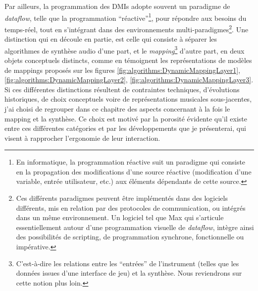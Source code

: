 \indent Par ailleurs, la programmation des \glspl{DMI} adopte souvent un paradigme de \textit{dataflow}, telle que la programmation ``réactive''\footnote{En informatique, la programmation réactive suit un paradigme qui consiste en la propagation des modifications d'une source réactive (modification d'une variable, entrée utilisateur, etc.) aux éléments dépendants de cette source.}, pour répondre aux besoins du temps-réel, tout en s'intégrant dans des environnements multi-paradigmes\footnote{Ces différents paradigmes peuvent être implémentés dans des logiciels différents, mis en relation par des protocoles de communication, ou intégrés dans un même environnement. Un logiciel tel que Max qui s'articule essentiellement autour d'une programmation visuelle de \textit{dataflow}, intègre ainsi des possibilités de scripting, de programmation synchrone, fonctionnelle ou impérative.}. Une distinction qui en découle en partie, est celle qui consiste à séparer les algorithmes de synthèse audio d'une part, et le \textit{mapping}\footnote{C'est-à-dire les relations entre les ``entrées'' de l'instrument (telles que les données issues d'une interface de jeu) et la synthèse. Nous reviendrons sur cette notion plus loin.} d'autre part, en deux objets conceptuels distincts, comme en témoignent les représentations de modèles de mappings proposés sur les figures \ref{fig:algorithms:DynamicMappingLayer1}, \ref{fig:algorithms:DynamicMappingLayer2}, \ref{fig:algorithms:DynamicMappingLayer3}.\\
\indent Si ces différentes distinctions résultent de contraintes techniques, d'évolutions historiques, de choix conceptuels voire de représentations musicales sous-jacentes, j'ai choisi de regrouper dans ce chapitre des aspects concernant à la fois le mapping et la synthèse. Ce choix est motivé par la porosité évidente qu'il existe entre ces différentes catégories et par les développements que je présenterai, qui visent à rapprocher l'ergonomie de leur interaction.





